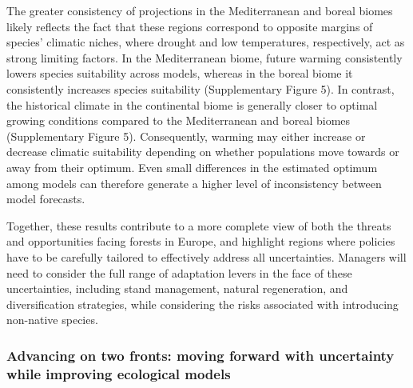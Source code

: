 \documentclass[11pt,letter]{article}
\begin{document}
The greater consistency of projections in the Mediterranean and boreal biomes likely reflects the fact that these regions correspond to opposite margins of species' climatic niches, where drought and low temperatures, respectively, act as strong limiting factors. In the Mediterranean biome, future warming consistently lowers species suitability across models, whereas in the boreal biome it consistently increases species suitability (Supplementary Figure 5). In contrast, the historical climate in the continental biome is generally closer to optimal growing conditions compared to the Mediterranean and boreal biomes (Supplementary Figure 5). Consequently, warming may either increase or decrease climatic suitability depending on whether populations move towards or away from their optimum. Even small differences in the estimated optimum among models can therefore generate a higher level of inconsistency between model forecasts.

Together, these results contribute to a more complete view of both the threats and opportunities facing forests in Europe, and highlight regions where policies have to be carefully tailored to effectively address all uncertainties.
Managers will need to consider the full range of adaptation levers in the face of these uncertainties, including stand management, natural regeneration, and diversification strategies, while considering the risks associated with introducing non-native species\citep{NadalSala2019}.



\subsubsection*{Advancing on two fronts: moving forward with uncertainty while improving ecological models}
\end{document}
